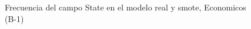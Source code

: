 \begin{figure}[H]
    \centering
    
    \caption{Frecuencia del campo State en el modelo real y smote, Economicos (B-1)}
    \label{frecuency-State-smote-enc}
\end{figure}